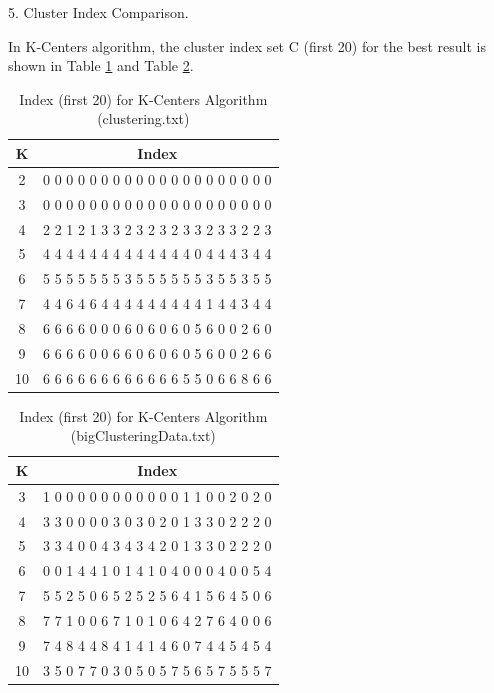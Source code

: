 \begin{description}
\begin{description}
\item{5.} Cluster Index Comparison.

In K-Centers algorithm, the cluster index set C (first 20) for the best result is shown in Table \ref{table:index_kcenter_clustering} and Table \ref{table:index_kcenter_bigClustering}.

\begin{table}[H]
	\centering
	\caption{Index (first 20) for K-Centers Algorithm (clustering.txt)}
	\label{table:index_kcenter_clustering}	
	\begin{tabular}{ c | c }
		\hline \hline
		K        &    Index  \\[0.1cm]
		\hline
		2     &  0 0 0 0 0 0 0 0 0 0 0 0 0 0 0 0 0 0 0 0 \\[0.1cm]
		3     &  0 0 0 0 0 0 0 0 0 0 0 0 0 0 0 0 0 0 0 0 \\[0.1cm]
		4     &  2 2 1 2 1 3 3 2 3 2 3 2 3 3 2 3 3 2 2 3 \\[0.1cm]
		5     &  4 4 4 4 4 4 4 4 4 4 4 4 4 0 4 4 4 3 4 4 \\[0.1cm]
		6     &  5 5 5 5 5 5 5 3 5 5 5 5 5 5 3 5 5 3 5 5 \\[0.1cm]
		7     &  4 4 6 4 6 4 4 4 4 4 4 4 4 4 1 4 4 3 4 4 \\[0.1cm]
		8     &  6 6 6 6 0 0 0 6 0 6 0 6 0 5 6 0 0 2 6 0 \\[0.1cm]
		9     &  6 6 6 6 0 0 6 6 0 6 0 6 0 5 6 0 0 2 6 6 \\[0.1cm]
		10   &  6 6 6 6 6 6 6 6 6 6 6 6 5 5 0 6 6 8 6 6 \\[0.1cm]
		\hline	
	\end{tabular}
\end{table}

\begin{table}[H]
	\centering
	\caption{Index (first 20) for K-Centers Algorithm (bigClusteringData.txt)}
	\label{table:index_kcenter_bigClustering}	
	\begin{tabular}{ c | c }
		\hline \hline
		K    & Index \\[0.1cm]
		\hline
		3     &  1 0 0 0 0 0 0 0 0 0 0 0 1 1 0 0 2 0 2 0 \\[0.1cm]
		4     &  3 3 0 0 0 0 3 0 3 0 2 0 1 3 3 0 2 2 2 0 \\[0.1cm]
		5     &  3 3 4 0 0 4 3 4 3 4 2 0 1 3 3 0 2 2 2 0 \\[0.1cm]
		6     &  0 0 1 4 4 1 0 1 4 1 0 4 0 0 0 4 0 0 5 4 \\[0.1cm]
		7     &  5 5 2 5 0 6 5 2 5 2 5 6 4 1 5 6 4 5 0 6 \\[0.1cm]
		8     &  7 7 1 0 0 6 7 1 0 1 0 6 4 2 7 6 4 0 0 6 \\[0.1cm]
		9     &  7 4 8 4 4 8 4 1 4 1 4 6 0 7 4 4 5 4 5 4 \\[0.1cm]
		10   &  3 5 0 7 7 0 3 0 5 0 5 7 5 6 5 7 5 5 5 7 \\[0.1cm]
		\hline	
	\end{tabular}
\end{table}


\end{description}
\end{description}
